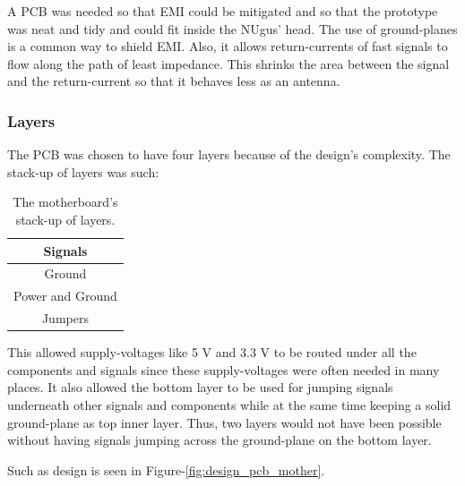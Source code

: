 \documentclass[notitlepage]{report}
\begin{document}
A PCB was needed so that EMI could be mitigated and so that the prototype was neat and tidy and could fit inside the NUgus' head. The use of ground-planes is a common way to shield EMI. Also, it allows return-currents of fast signals to flow along the path of least impedance. This shrinks the area between the signal and the return-current so that it behaves less as an antenna.

\subsubsection{Layers}

The PCB was chosen to have four layers because of the design's complexity. The stack-up of layers was such:

\begin{table}[H]
\caption{The motherboard's stack-up of layers.}
\label{tab:pcb_layers}
\centering
\begin{tabular}{c}
	\hline
	Signals \\
	\hline
	Ground \\
	\hline
	Power and Ground \\
	\hline
	Jumpers \\
	\hline
\end{tabular}
\centering
\end{table}

This allowed supply-voltages like 5 \si{V} and 3.3 \si{V} to be routed under all the components and signals since these supply-voltages were often needed in many places. It also allowed the bottom layer to be used for jumping signals underneath other signals and components while at the same time keeping a solid ground-plane as top inner layer. Thus, two layers would not have been possible without having signals jumping across the ground-plane on the bottom layer.

Such as design is seen in Figure-\ref{fig:design_pcb_mother}.
\end{document}
